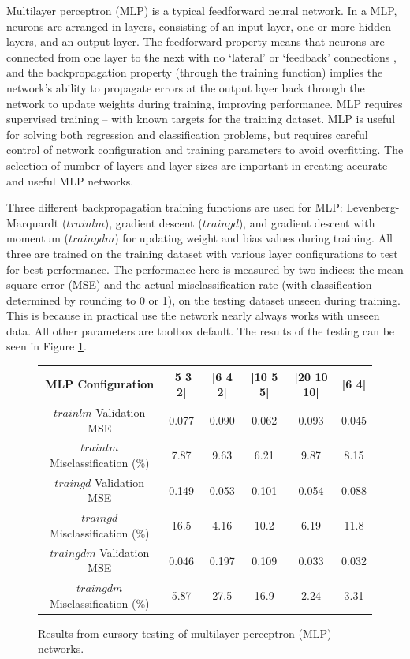 \documentclass[10pt, oneside]{article}
\begin{document}
Multilayer perceptron (MLP) is a typical feedforward neural network. In a MLP, neurons are arranged in layers, consisting of an input layer, one or more hidden layers, and an output layer. The feedforward property means that neurons are connected from one layer to the next with no `lateral' or `feedback' connections \cite{som-lecture}, and the backpropagation property (through the training function) implies the network's ability to propagate errors at the output layer back through the network to update weights during training, improving performance. MLP requires supervised training -- with known targets for the training dataset. MLP is useful for solving both regression and classification problems, but requires careful control of network configuration and training parameters to avoid overfitting. The selection of number of layers and layer sizes are important in creating accurate and useful MLP networks.

Three different backpropagation training functions are used for MLP: Levenberg-Marquardt ($trainlm$), gradient descent ($traingd$), and gradient descent with momentum ($traingdm$) for updating weight and bias values during training. All three are trained on the training dataset with various layer configurations to test for best performance. The performance here is measured by two indices: the mean square error (MSE) and the actual misclassification rate (with classification determined by rounding to 0 or 1), on the testing dataset unseen during training. This is because in practical use the network nearly always works with unseen data. All other parameters are toolbox default. The results of the testing can be seen in Figure \ref{fig:mlp-testing}.

\begin{figure}[h]
\begin{center}
\fontsize{9}{11}\selectfont
\begin{tabular}{|c|c|c|c|c|c|}
\hline 
MLP Configuration & [5 3 2] & [6 4 2] & [10 5 5] & [20 10 10] & [6 4] \\ \hline \hline 
$trainlm$ Validation MSE & 0.077 & 0.090 & 0.062 & 0.093 & 0.045 \\ \hline 
$trainlm$ Misclassification (\%) & 7.87 & 9.63 & 6.21 & 9.87 & 8.15 \\ \hline \hline 
$traingd$ Validation MSE & 0.149 & 0.053 & 0.101 & 0.054 & 0.088 \\ \hline 
$traingd$ Misclassification (\%) & 16.5 & 4.16 & 10.2 & 6.19 & 11.8 \\ \hline \hline 
$traingdm$ Validation MSE & 0.046 & 0.197 & 0.109 & 0.033 & 0.032 \\ \hline 
$traingdm$ Misclassification (\%) & 5.87 & 27.5 & 16.9 & 2.24 & 3.31 \\ \hline 
\end{tabular}
\end{center}
\caption{\label{fig:mlp-testing} Results from cursory testing of multilayer perceptron (MLP) networks.}
\end{figure}
\end{document}

